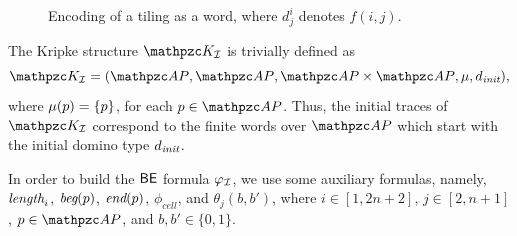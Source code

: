 \begin{figure}[tb]
    \centering
    \resizebox{\linewidth}{!}{}
    \vspace{-0.4cm}
    \caption{Encoding of a tiling as a word, where $d^i_j$ denotes $f(i,j)$.}\label{fig:row}
\end{figure}

The Kripke structure $\Ku_\Instance$ is trivially defined as
 \[
 \Ku_\Instance = \tpl{\Prop, \Prop, \Prop\times \Prop, \Lab,d_\Init}
 ,\]
 where $\mu(p)=\{p\}$, for each $p\in\Prop$. Thus, the initial traces of $\Ku_\Instance$ correspond to the finite words over $\Prop$ which start with the initial domino type $d_{\textit{init}}$.
 
In order to build the $\mathsf{BE}$ formula $\varphi_{\mathcal{I}}$, we use some auxiliary formulas, namely, $\textit{length}_i$, $\textit{beg}(p)$, $\textit{end}(p)$, $\phi_{\textit{cell}}$, and $\theta_j(b,b')$, where $i\in [1,2n+2]$, $j\in [2,n+1]$, $p\in \Prop$, and $b,b'\in \{0,1\}$.

